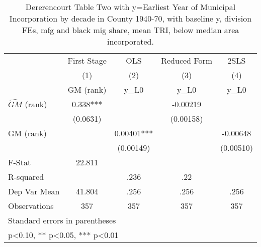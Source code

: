 \begin{table}[htbp]\centering
\def\sym#1{\ifmmode^{#1}\else\(^{#1}\)\fi}
\caption{Dererencourt Table Two with y=Earliest Year of Municipal Incorporation by decade in County 1940-70, with baseline y, division FEs, mfg and black mig share, mean TRI, below median area incorporated.}
\begin{tabular}{l*{4}{c}}
\toprule
                    & First Stage   &         OLS   &Reduced Form   &        2SLS   \\
                    &\multicolumn{1}{c}{(1)}&\multicolumn{1}{c}{(2)}&\multicolumn{1}{c}{(3)}&\multicolumn{1}{c}{(4)}\\
                    &\multicolumn{1}{c}{GM  (rank)}&\multicolumn{1}{c}{y\_L0}&\multicolumn{1}{c}{y\_L0}&\multicolumn{1}{c}{y\_L0}\\
\midrule
$\hat{GM}$ (rank)   &       0.338***&               &    -0.00219   &               \\
                    &    (0.0631)   &               &   (0.00158)   &               \\
\addlinespace
GM  (rank)          &               &     0.00401***&               &    -0.00648   \\
                    &               &   (0.00149)   &               &   (0.00510)   \\
\midrule
F-Stat              &      22.811   &               &               &               \\
R-squared           &               &        .236   &         .22   &               \\
Dep Var Mean        &      41.804   &        .256   &        .256   &        .256   \\
Observations        &         357   &         357   &         357   &         357   \\
\bottomrule
\multicolumn{5}{l}{\footnotesize Standard errors in parentheses}\\
\multicolumn{5}{l}{\footnotesize * p<0.10, ** p<0.05, *** p<0.01}\\
\end{tabular}
\end{table}
